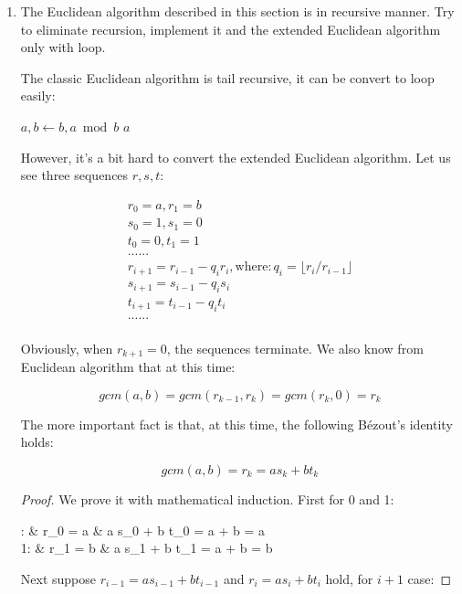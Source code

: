 \documentclass[UTF8]{article}
\begin{document}
\begin{enumerate}
\item {The Euclidean algorithm described in this section is in recursive manner. Try to eliminate recursion, implement it and the extended Euclidean algorithm only with loop.}

The classic Euclidean algorithm is tail recursive, it can be convert to loop easily:

\begin{algorithmic}
  \State $a, b \gets b, a \bmod b$
\EndWhile
\State \Return $a$
\EndFunction
\end{algorithmic}

However, it's a bit hard to convert the extended Euclidean algorithm. Let us see three sequences $r, s, t$:

\[\begin{array}{l}
r_0 = a, r_1 = b \\
s_0 = 1, s_1 = 0 \\
t_0 = 0, t_1 = 1 \\
 ...  ... \\
r_{i+1} = r_{i-1} - q_{i} r_{i}, \text{where}: q_{i} = \lfloor r_{i} / r_{i-1} \rfloor \\
s_{i+1} = s_{i-1} - q_{i} s_{i} \\
t_{i+1} = t_{i-1} - q_{i} t_{i} \\
... ...\\
\end{array}\]

Obviously, when $r_{k+1} = 0$, the sequences terminate. We also know from Euclidean algorithm that at this time:

\[
gcm(a, b) = gcm(r_{k-1}, r_{k}) = gcm(r_k, 0) = r_{k}
\]

The more important fact is that, at this time, the following Bézout's identity holds:

\[
gcm(a, b) = r_{k} = a s_{k} + b t_{k}
\]

\begin{proof}
We prove it with mathematical induction. First for 0 and 1:

: & r_0 = a & a s_0 + b t_0 = a  + b  = a \\
1: & r_1 = b & a s_1 + b t_1 = a  + b  = b \\
\elre

Next suppose $r_{i-1} = a s_{i-1} + b t_{i-1}$ and $r_{i} = a s_{i} + b t_{i}$ hold, for $i + 1$ case:


\end{proof}
\end{enumerate}
\end{document}
